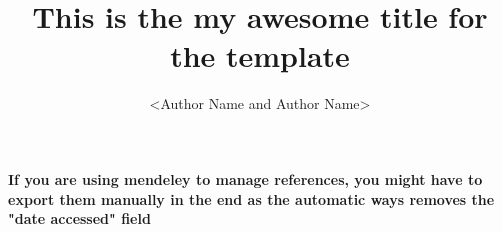 \documentclass[12pt,twoside]{article}
\title{This is the my awesome title for the template}
\author{<Author Name and Author Name>}
\begin{document}



\pagestyle{empty}
\insertempty



\customtoc


\restoregeometry
\pagestyle{fancy}








% 

\newpage
{}
\textbf{If you are using mendeley to manage references, you might have to export them manually in the end as the automatic ways removes the "date accessed" field}
\printbibliography




\end{document}
